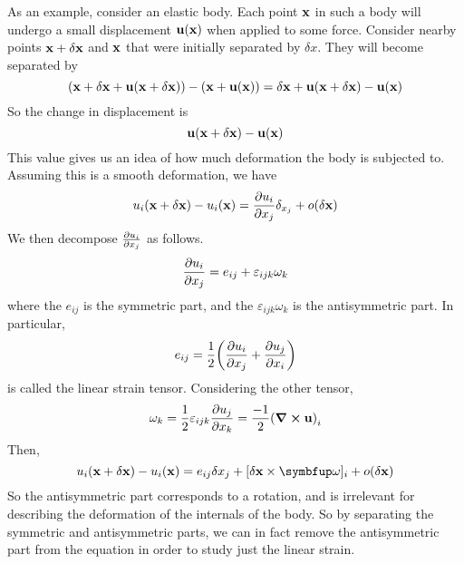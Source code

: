 As an example, consider an elastic body.
Each point \(\vb x\) in such a body will undergo a small displacement \(\vb u(\vb x)\) when applied to some force.
Consider nearby points \(\vb x + \delta\vb x\) and \(\vb x\) that were initially separated by \(\delta x\).
They will become separated by
\[
	(\vb x + \delta \vb x + \vb u(\vb x + \delta\vb x)) - (\vb x + \vb u(\vb x)) = \delta \vb x + \vb u(\vb x + \delta\vb x) - \vb u(\vb x)
\]
So the change in displacement is
\[
	\vb u(\vb x + \delta\vb x) - \vb u(\vb x)
\]
This value gives us an idea of how much deformation the body is subjected to.
Assuming this is a smooth deformation, we have
\[
	u_i(\vb x + \delta\vb x) - u_i(\vb x) = \pdv{u_i}{x_j}\delta_{x_j} + o(\delta \vb x)
\]
We then decompose \(\pdv{u_i}{x_j}\) as follows.
\[
	\pdv{u_i}{x_j} = e_{ij} + \varepsilon_{ijk}\omega_k
\]
where the \(e_{ij}\) is the symmetric part, and the \(\varepsilon_{ijk}\omega_k\) is the antisymmetric part.
In particular,
\[
	e_{ij} = \frac{1}{2}\qty(\pdv{u_i}{x_j} + \pdv{u_j}{x_i})
\]
is called the linear strain tensor.
Considering the other tensor,
\[
	\omega_k = \frac{1}{2}\varepsilon_{ijk}\pdv{u_j}{x_k} = \frac{-1}{2}\qty(\curl{\vb u})_i
\]
Then,
\[
	u_i(\vb x + \delta \vb x) - u_i(\vb x) = e_{ij} \delta x_j + [\delta \vb x \times \bm \omega]_i + o(\delta \vb x)
\]
So the antisymmetric part corresponds to a rotation, and is irrelevant for describing the deformation of the internals of the body.
So by separating the symmetric and antisymmetric parts, we can in fact remove the antisymmetric part from the equation in order to study just the linear strain.

